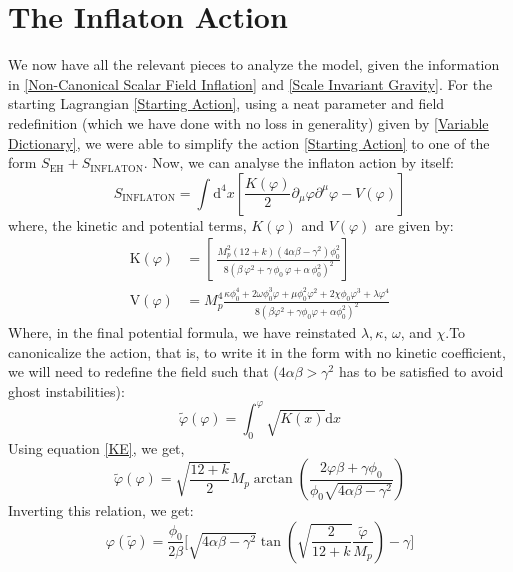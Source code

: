 \documentclass[aps,prd,reprint,preprintnumbers,showpacs,floatfix,nofootinbib,superscript address]{revtex4-2}
\newcommand{\wb}[1]{{\color[RGB]{255,0,0}{\textbf{\textit{[WB: #1]}}}}}
\begin{document}
\section{The Inflaton Action} \label{Solution}
We now have all the relevant pieces to analyze the model, given the information in \cref{Non-Canonical Scalar Field Inflation}  and \cref{Scale Invariant Gravity}. For the starting Lagrangian \cref{Starting Action}, using a neat\wb{suitable?} parameter and field redefinition (which we have done with no loss in generality) given by \cref{Variable Dictionary}, we were able to simplify the action \cref{Starting Action} to one of the form $S_{\text{EH}} + S_{\text{INFLATON}}$. Now, we can analyse the inflaton action by itself: 
\begin{equation}
    S_{\text{INFLATON}} = \int \text{d}^4x \left[ \frac{K(\varphi)}{2} \partial_\mu \varphi \partial^\mu \varphi - V(\varphi)\right]
\end{equation}
where, the kinetic and potential terms, $K(\varphi)$ and $V(\varphi)$ are given by:
\begin{align}
    \text{K}(\varphi) &= \left[\ \frac{M_p^2(12+k)(4\alpha\beta-\gamma^2) \phi_0^2}{8(\beta\,\varphi^2 + \gamma\,\phi_0\,\varphi + \alpha\,\phi_0^2)^2} \right] \label{KE} \\
    \text{V}(\varphi) &= M_p^4  \frac{ \kappa \phi_0^4 + 2\omega \phi_0^3 \varphi +\mu \phi^2_0 \varphi^2 + 2\chi \phi_0 \varphi^3 + \lambda \varphi^4 }{8(\beta \varphi^2 + \gamma\phi_0\varphi + \alpha \phi_0^2)^2} \label{VE}
\end{align}
Where, in the final potential formula, we have reinstated $\lambda, \kappa$, $\omega$, and $\chi$.To canonicalize the action, that is, to write it in the form with no kinetic coefficient, we will need to redefine the field such that ($4\alpha \beta > \gamma^2$ has to be satisfied to avoid ghost instabilities):
\begin{equation} \label{40}
    \tilde{\varphi}(\varphi) = \int_0^{\varphi} \sqrt{K(x)} \text{d}x
\end{equation}
Using equation \cref{KE}, we get,
\begin{equation}
    \tilde{\varphi}(\varphi) = \sqrt{\frac{12+k}{2}}M_p \arctan \left( \frac{2\varphi\beta + \gamma \phi_0}{\phi_0\sqrt{4\alpha\beta - \gamma^2}} \right)
\end{equation}
Inverting this relation, we get:
\begin{equation}
    \varphi(\tilde{\varphi}) = \frac{\phi_0}{2\beta} \Biggl[ \sqrt{4\alpha\beta - \gamma^2} \tan\left(\sqrt{\frac{2}{12+k}}\frac{\tilde{\varphi}}{M_p}\right) - \gamma \Biggr] 
\end{equation}
\end{document}
